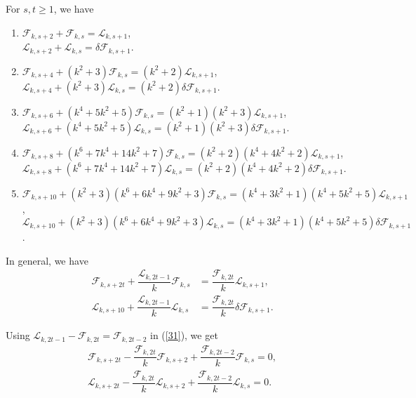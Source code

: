 \begin{theorem}For $s, t\geq 1$, we have\label{3.14}
\begin{enumerate}
\item $\mathcal{F}_{k,s+2}+\mathcal{F}_{k,s}=\mathcal{L}_{k,s+1}$,\\
$\mathcal{L}_{k,s+2}+\mathcal{L}_{k,s}=\delta\mathcal{F}_{k,s+1}$.
\item $\mathcal{F}_{k,s+4}+(k^2+3)\mathcal{F}_{k,s}=(k^2+2)\mathcal{L}_{k,s+1}$,\\
$\mathcal{L}_{k,s+4}+(k^2+3)\mathcal{L}_{k,s}=(k^2+2)\delta\mathcal{F}_{k,s+1}$.
\item $\mathcal{F}_{k,s+6}+(k^4+5k^2+5)\mathcal{F}_{k,s}=(k^2+1)(k^2+3)\mathcal{L}_{k,s+1}$,\\
$\mathcal{L}_{k,s+6}+(k^4+5k^2+5)\mathcal{L}_{k,s}=(k^2+1)(k^2+3)\delta\mathcal{F}_{k,s+1}$.
\item $\mathcal{F}_{k,s+8}+(k^6+7k^4+14k^2+7)\mathcal{F}_{k,s}=(k^2+2)(k^4+4k^2+2)\mathcal{L}_{k,s+1}$,\\
$\mathcal{L}_{k,s+8}+(k^6+7k^4+14k^2+7)\mathcal{L}_{k,s}=(k^2+2)(k^4+4k^2+2)\delta\mathcal{F}_{k,s+1}$.
\item $\mathcal{F}_{k,s+10}+(k^2+3)(k^6+6k^4+9k^2+3)\mathcal{F}_{k,s}=(k^4+3k^2+1)(k^4+5k^2+5)\mathcal{L}_{k,s+1}$,\\
$\mathcal{L}_{k,s+10}+(k^2+3)(k^6+6k^4+9k^2+3)\mathcal{L}_{k,s}=(k^4+3k^2+1)(k^4+5k^2+5)\delta\mathcal{F}_{k,s+1}$.
\end{enumerate}
In general, we have
\begin{align}\label{31}
\mathcal{F}_{k,s+2t}+\dfrac{\mathcal{L}_{k,2t-1}}{k}\mathcal{F}_{k,s}&=\dfrac{\mathcal{F}_{k,2t}}{k}\mathcal{L}_{k,s+1},\\
\mathcal{L}_{k,s+10}+\dfrac{\mathcal{L}_{k,2t-1}}{k}\mathcal{L}_{k,s}&=\dfrac{\mathcal{F}_{k,2t}}{k}\delta\mathcal{F}_{k,s+1}.
\end{align}
\end{theorem}
\begin{remark}
Using $\mathcal{L}_{k,2t-1}-\mathcal{F}_{k,2t}=\mathcal{F}_{k,2t-2}$ in (\ref{31}), we get
\begin{align*}
\mathcal{F}_{k,s+2t}-\dfrac{\mathcal{F}_{k,2t}}{k}\mathcal{F}_{k,s+2}+\dfrac{\mathcal{F}_{k,2t-2}}{k}\mathcal{F}_{k,s}=0,\\
\mathcal{L}_{k,s+2t}-\dfrac{\mathcal{F}_{k,2t}}{k}\mathcal{L}_{k,s+2}+\dfrac{\mathcal{F}_{k,2t-2}}{k}\mathcal{L}_{k,s}=0.
\end{align*}
\end{remark}
